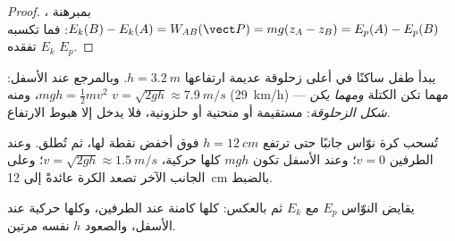 \begin{proof}
بمبرهنة ، $E_k(B) - E_k(A) = W_{AB}(\vect P) =
mg(z_A - z_B) = E_p(A) - E_p(B)$: فما تكسبه $E_k$ تفقده $E_p$.
\end{proof}

\begin{example}\label{ex:g11:mechanical-energy:slide}
يبدأ طفل ساكنًا في أعلى زحلوقة عديمة  ارتفاعها
$h = \qty{3.2}{m}$. وبالمرجع عند الأسفل: $mgh = \tfrac12 mv^2$، ومنه
$v = \sqrt{2gh} \approx \qty{7.9}{m/s}$ (\qty{29}{km/h}) --- مهما تكن
الكتلة \emph{ومهما يكن شكل الزحلوقة}: مستقيمة أو منحنية
أو حلزونية، فلا يدخل إلا هبوط الارتفاع.
\end{example}

\begin{example}[النوّاس]\label{ex:g11:mechanical-energy:pendulum}
تُسحب كرة نوّاس جانبًا حتى ترتفع $h = \qty{12}{cm}$ فوق
أخفض نقطة لها، ثم تُطلق. وعند الطرفين $v = 0$؛ وعند الأسفل
تكون $mgh$ كلها حركية، $v = \sqrt{2gh} \approx \qty{1.5}{m/s}$؛
وعلى الجانب الآخر تصعد الكرة عائدةً إلى \qty{12}{cm} بالضبط.
\end{example}

\begin{omfigure}

{\small يقايض النوّاس $E_p$ مع $E_k$ ثم بالعكس: كلها كامنة
عند الطرفين، وكلها حركية عند الأسفل، والصعود $h$ نفسه مرتين.}
\end{omfigure}

